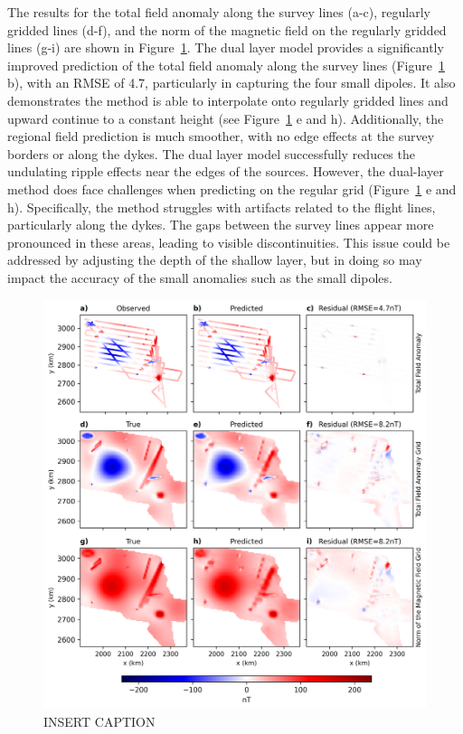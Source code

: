 The results for the total field anomaly along the survey lines (a-c), regularly gridded lines (d-f), and the norm of the magnetic field on the regularly gridded lines (g-i) are shown in Figure~\ref{fig:dual_layer_synthetic}. The dual layer model provides a significantly improved prediction of the total field anomaly along the survey lines (Figure~\ref{fig:dual_layer_synthetic} b), with an RMSE of 4.7, particularly in capturing the four small dipoles. It also demonstrates the method is able to interpolate onto regularly gridded lines and upward continue to a constant height (see Figure~\ref{fig:dual_layer_synthetic} e and h). Additionally, the regional field prediction is much smoother, with no edge effects at the survey borders or along the dykes. The dual layer model successfully reduces the undulating ripple effects near the edges of the sources. However, the dual-layer method does face challenges when predicting on the regular grid (Figure~\ref{fig:dual_layer_synthetic} e and h). Specifically, the method struggles with artifacts related to the flight lines, particularly along the dykes. The gaps between the survey lines appear more pronounced in these areas, leading to visible discontinuities. This issue could be addressed by adjusting the depth of the shallow layer, but in doing so may impact the accuracy of the small anomalies such as the small dipoles.
\clearpage

\begin{figure}[!h]
\centering
\includegraphics[width=1\linewidth]{figures/dual_layer_synthetic.png}
\caption{
    INSERT CAPTION
}
\label{fig:dual_layer_synthetic}
\end{figure}
\


